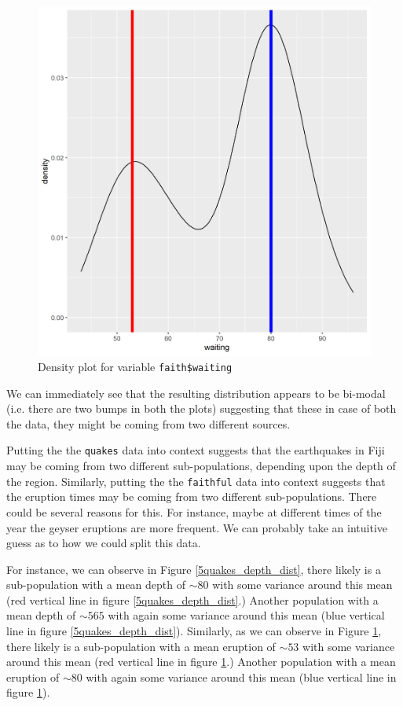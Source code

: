 \begin{figure}[h]
\centering
\includegraphics[scale=0.7, keepaspectratio]{ex5/5faith_wait_dist.png}
\caption{Density plot for  variable \texttt{faith\$waiting}}
\label{5faith_wait_dist}
\end{figure}

We can immediately see that the resulting distribution appears to be bi-modal (i.e. there are two bumps in both the plots) suggesting that these in case of both the data, they might be coming from two different sources.


Putting the the \texttt{quakes} data into context suggests that the earthquakes in Fiji may be coming from two different sub-populations, depending upon the depth of the region. Similarly, putting the the \texttt{faithful} data into context suggests that the eruption times may be coming from two different sub-populations. There could be several reasons for this. For instance, maybe at different times of the year the geyser eruptions are more frequent. We can probably take an intuitive guess as to how we could split this data.

For instance, we can observe in Figure \ref{5quakes_depth_dist}, there likely is a sub-population with a mean depth of $\sim 80$ with some variance around this mean (red vertical line in figure \ref{5quakes_depth_dist}.) Another population with a mean depth of $\sim 565$ with again some variance around this mean (blue vertical line in figure \ref{5quakes_depth_dist}). Similarly, as we can observe in Figure \ref{5faith_wait_dist}, there likely is a sub-population with a mean eruption of $\sim 53$ with some variance around this mean (red vertical line in figure \ref{5faith_wait_dist}.) Another population with a mean eruption of $\sim 80$ with again some variance around this mean (blue vertical line in figure \ref{5faith_wait_dist}).

